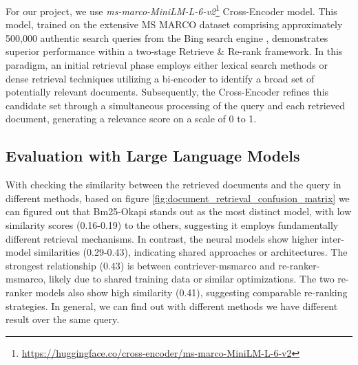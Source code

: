 For our project, we use \textit{ms-marco-MiniLM-L-6-v2}\footnote{\url{https://huggingface.co/cross-encoder/ms-marco-MiniLM-L-6-v2}} Cross-Encoder model.
This model, trained on the extensive MS MARCO dataset comprising approximately 500,000 authentic search queries from the Bing search engine \cite{reimers-2019-sentence-bert}, demonstrates superior performance within a two-stage Retrieve \& Re-rank framework.
In this paradigm, an initial retrieval phase employs either lexical search methods or dense retrieval techniques utilizing a bi-encoder to identify a broad set of potentially relevant documents.
Subsequently, the Cross-Encoder refines this candidate set through a simultaneous processing of the query and each retrieved document, generating a relevance score on a scale of 0 to 1.

\subsection{Evaluation with Large Language Models}\label{subsec:evaluation-with-large-language-models}
With checking the similarity between the retrieved documents and the query in different methods, based on figure \ref{fig:document_retrieval_confusion_matrix} we can figured out that Bm25-Okapi stands out as the most distinct model, with low similarity scores (0.16-0.19) to the others, suggesting it employs fundamentally different retrieval mechanisms.
In contrast, the neural models show higher inter-model similarities (0.29-0.43), indicating shared approaches or architectures.
The strongest relationship (0.43) is between contriever-msmarco and re-ranker-msmarco, likely due to shared training data or similar optimizations.
The two re-ranker models also show high similarity (0.41), suggesting comparable re-ranking strategies.
In general, we can find out with different methods we have different result over the same query.

